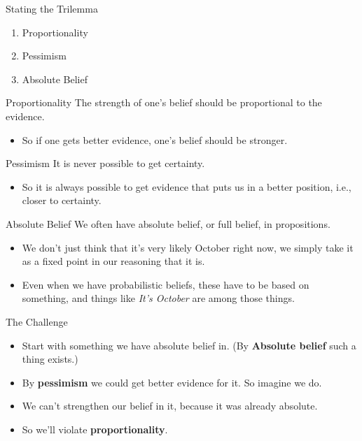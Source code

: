 \documentclass[
  17pt,
  letterpaper,
  ignorenonframetext,
  aspectratio=169,
  handout]{beamer}
\providecommand{\tightlist}{%
  \setlength{\itemsep}{0pt}\setlength{\parskip}{0pt}}\usepackage{longtable,booktabs,array}
\begin{document}
\begin{frame}{Stating the Trilemma}
\protect\hypertarget{stating-the-trilemma}{}
\begin{enumerate}[<+->]
\tightlist
\item
  Proportionality
\item
  Pessimism
\item
  Absolute Belief
\end{enumerate}
\end{frame}

\begin{frame}{Proportionality}
\protect\hypertarget{proportionality}{}
The strength of one's belief should be proportional to the evidence.

\begin{itemize}[<+->]
\tightlist
\item
  So if one gets better evidence, one's belief should be stronger.
\end{itemize}
\end{frame}

\begin{frame}{Pessimism}
\protect\hypertarget{pessimism}{}
It is never possible to get certainty.

\begin{itemize}[<+->]
\tightlist
\item
  So it is always possible to get evidence that puts us in a better
  position, i.e., closer to certainty.
\end{itemize}
\end{frame}

\begin{frame}{Absolute Belief}
\protect\hypertarget{absolute-belief}{}
We often have absolute belief, or full belief, in propositions.

\begin{itemize}[<+->]
\tightlist
\item
  We don't just think that it's very likely October right now, we simply
  take it as a fixed point in our reasoning that it is.
\item
  Even when we have probabilistic beliefs, these have to be based on
  something, and things like \emph{It's October} are among those things.
\end{itemize}
\end{frame}

\begin{frame}{The Challenge}
\protect\hypertarget{the-challenge}{}
\begin{itemize}[<+->]
\tightlist
\item
  Start with something we have absolute belief in. (By \textbf{Absolute
  belief} such a thing exists.)
\item
  By \textbf{pessimism} we could get better evidence for it. So imagine
  we do.
\item
  We can't strengthen our belief in it, because it was already absolute.
\item
  So we'll violate \textbf{proportionality}.
\end{itemize}
\end{frame}
\end{document}
